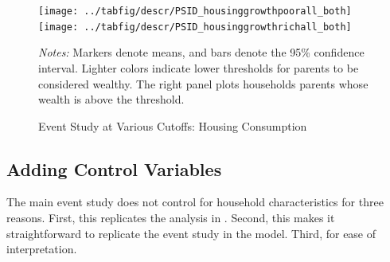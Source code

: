 \documentclass[12pt]{article}
\begin{document}
\begin{figure}
	\caption{Event Study at Various Cutoffs: Housing Consumption}\label{fig:housinggrowthrates_threshold} 
	\noindent%
	\texttt{[image: ../tabfig/descr/PSID\_housinggrowthpoorall\_both]}%
	\texttt{[image: ../tabfig/descr/PSID\_housinggrowthrichall\_both]}

	{\begin{footnotesize} \textit{Notes:} Markers denote means, and bars denote the 95\% confidence interval. Lighter colors indicate lower thresholds for parents to be considered wealthy. The right panel plots households parents whose wealth is above the threshold.\end{footnotesize}}
\end{figure}

\subsection{Adding Control Variables}
The main event study does not control for household characteristics for three reasons. First, this replicates the analysis in \cite{Chetty2007}. Second, this makes it straightforward to replicate the event study in the model. Third, for ease of interpretation. 
\end{document}
